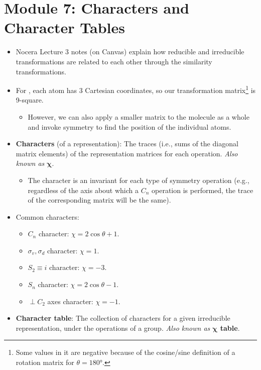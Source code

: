\documentclass[../notes.tex]{subfiles}
\begin{document}
\section{Module 7: Characters and Character Tables}
\begin{itemize}
    \item {}Nocera Lecture 3 notes (on Canvas) explain how reducible and irreducible transformations are related to each other through the similarity transformations.
    \item For , each atom has 3 Cartesian coordinates, so our transformation matrix\footnote{Some values in it are negative because of the cosine/sine definition of a rotation matrix for $\theta=\ang{180}$.} is 9-square.
    \begin{itemize}
        \item However, we can also apply a smaller matrix to the molecule as a whole and invoke symmetry to find the position of the individual atoms.
    \end{itemize}
    \item \textbf{Characters} (of a representation): The traces (i.e., sums of the diagonal matrix elements) of the representation matrices for each operation. \emph{Also known as} $\bm{\chi}$.
    \begin{itemize}
        \item The character is an invariant for each type of symmetry operation (e.g., regardless of the axis about which a $C_n$ operation is performed, the trace of the corresponding matrix will be the same).
    \end{itemize}
    \item Common characters:
    \begin{itemize}
        \item $C_n$ character: $\chi=2\cos\theta+1$.
        \item $\sigma_v,\sigma_d$ character: $\chi=1$.
        \item $S_2\equiv i$ character: $\chi=-3$.
        \item $S_n$ character: $\chi=2\cos\theta-1$.
        \item $\perp C_2$ axes character: $\chi=-1$.
    \end{itemize}
    \item \textbf{Character table}: The collection of characters for a given irreducible representation, under the operations of a group. \emph{Also known as} \textbf{$\bm{\chi}$ table}.
    \begin{figure}[h!]

\end{figure}
\end{itemize}
\end{document}
